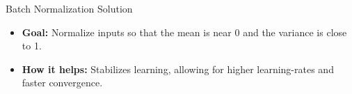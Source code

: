 \documentclass[serif, aspectratio=169]{beamer}
\begin{document}
\begin{frame}{Batch Normalization Solution}

    \begin{itemize}
        \item \textbf{Goal:} Normalize inputs so that the mean is near 0 and the variance is close to 1.
        \item \textbf{How it helps:} Stabilizes learning, allowing for higher learning-rates and faster convergence.
    \end{itemize}

\end{frame}

%	
%	
%	
%	
%
%	
%	
%	
%	
\end{document}
